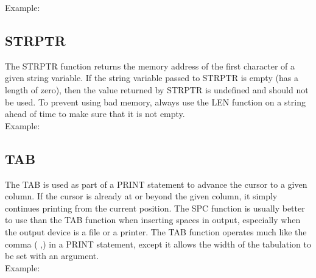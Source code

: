Example:\\


\subsection{STRPTR}

The {\ttfamily STRPTR} function returns the memory address of the first
character of a given string variable.  If the string variable passed to
{\ttfamily STRPTR} is empty (has a length of zero), then the value returned by
{\ttfamily STRPTR} is undefined and should not be used.  To prevent using bad
memory, always use the {\ttfamily LEN} function on a string ahead of time to
make sure that it is not empty.\\

Example:\\


\subsection{TAB}

The {\ttfamily TAB} is used as part of a {\ttfamily PRINT} statement to advance
the cursor to a given column.  If the cursor is already at or beyond the given
column, it simply continues printing from the current position.  The {\ttfamily
SPC} function is usually better to use than the {\ttfamily TAB} function when
inserting spaces in output, especially when the output device is a file or a
printer.  The {\ttfamily TAB} function operates much like the comma ({\ttfamily
,}) in a {\ttfamily PRINT} statement, except it allows the width of the
tabulation to be set with an argument.\\

Example:\\

